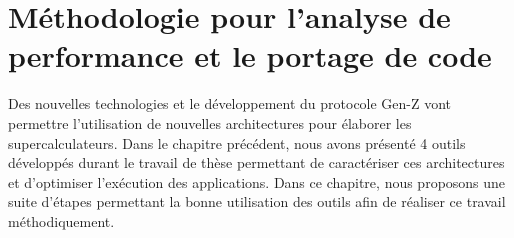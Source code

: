 \chapter{Méthodologie pour l'analyse de performance et le portage de code}
\label{chap:methodo}

Des nouvelles technologies et le développement du protocole Gen-Z vont permettre l'utilisation de nouvelles architectures pour élaborer les supercalculateurs. Dans le chapitre précédent, nous avons présenté 4  outils développés durant le travail de thèse permettant de caractériser ces architectures et d'optimiser l'exécution des applications. Dans ce chapitre, nous proposons une suite d'étapes permettant la bonne utilisation des outils afin de réaliser ce travail méthodiquement.

\minitoc
\glsresetall












